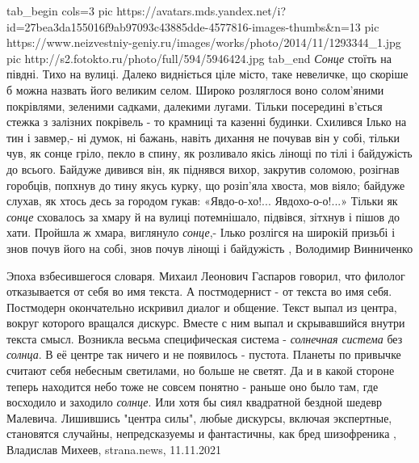 \ifcmt
  tab_begin cols=3
     pic https://avatars.mds.yandex.net/i?id=27bea3da155016f9ab97093c43885dde-4577816-images-thumbs&n=13
     pic https://www.neizvestniy-geniy.ru/images/works/photo/2014/11/1293344_1.jpg
		 pic http://s2.fotokto.ru/photo/full/594/5946424.jpg
  tab_end
\fi
\emph{Сонце} стоїть на півдні. Тихо на вулиці. Далеко видніється ціле місто,
таке невеличке, що скоріше б можна назвать його великим селом. Широко
розляглося воно солом'яними покрівлями, зеленими садками, далекими лугами.
Тільки посередині в'ється стежка з залізних покрівель - то крамниці та казенні
будинки.  Схилився Ілько на тин і завмер,- ні думок, ні бажань, навіть дихання
не почував він у собі, тільки чув, як сонце гріло, пекло в спину, як розливало
якісь лінощі по тілі і байдужість до всього. Байдуже дивився він, як піднявся
вихор, закрутив соломою, розігнав горобців, попхнув до тину якусь курку, що
розіп'яла хвоста, мов віяло; байдуже слухав, як хтось десь за городом гукав:
«Явдо-о-хо!... Явдохо-о-о!...» Тільки як \emph{сонце} сховалось за хмару й на
вулиці потемнішало, підвівся, зітхнув і пішов до хати. Пройшла ж хмара,
виглянуло \emph{сонце},- Ілько розлігся на широкій призьбі і знов почув його на
собі, знов почув лінощі і байдужість
, Володимир Винниченко

Эпоха взбесившегося словаря. Михаил Леонович Гаспаров говорил, что филолог
отказывается от себя во имя текста. А постмодернист - от текста во имя себя.
Постмодерн окончательно искривил диалог и общение.  Текст выпал из центра,
вокруг которого вращался дискурс.  Вместе с ним выпал и скрывавшийся внутри
текста смысл.  Возникла весьма специфическая система - \emph{солнечная система} без
\emph{солнца}.  В её центре так ничего и не появилось - пустота.  Планеты по привычке
считают себя небесным светилами, но больше не светят.  Да и в какой стороне
теперь находится небо тоже не совсем понятно - раньше оно было там, где
восходило и заходило \emph{солнце}. Или хотя бы сиял квадратной бездной шедевр
Малевича.  Лишившись "центра силы", любые дискурсы, включая экспертные,
становятся случайны, непредсказуемы и фантастичны, как бред шизофреника
, 
Владислав Михеев, strana.news, 11.11.2021
